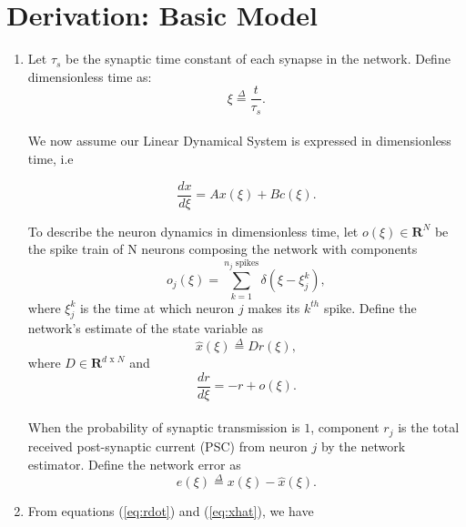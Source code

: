 \section{Derivation: Basic Model}
\label{section:derivation:basic_model}
\begin{enumerate}
    \item Let $\tau_s$ be the synaptic time constant of each synapse in the network. Define dimensionless time as:
    \begin{equation*}
        \xi \overset{\Delta}{=} \frac{t}{\tau_s}.
    \end{equation*}\\
    We now assume our Linear Dynamical System is expressed in dimensionless time, i.e
    
    \begin{equation}
        \label{eq:lds_dimensionless}
        \frac{dx}{d\xi} = Ax(\xi) + B c(\xi).
    \end{equation}
    
    To describe the neuron dynamics in dimensionless time, let $o(\xi) \in \mathbf{R}^{N}$ be the spike train of N neurons composing the network with components
    \begin{equation*}
        o_j(\xi) = \sum_{k=1}^{\text{$n_j$ spikes}} \delta(\xi - \xi_{j}^{k}),
    \end{equation*}
    where $\xi_j^k$ is the time at which neuron $j$ makes its $k^{th}$ spike. 
    Define the network's estimate of the state variable as
    \begin{equation}
        \label{eq:xhat}
        \hat{x}(\xi)
        \overset{\Delta}{=} D r(\xi), 
    \end{equation}
    where $D \in \mathbf{R}^{d \text{ x } N}$ and 
    \begin{equation}
    \label{eq:rdot}
        \frac{dr}{d \xi} = -r + o(\xi).
    \end{equation}\\
    When the probability of synaptic transmission is $1$, component $r_j$ is the total received post-synaptic current (PSC) from neuron $j$ by the network estimator. 
    Define the network error as
    \begin{equation}
    \label{eq:error_def}
        e(\xi) \overset{\Delta}{=} x(\xi) - \hat{x}(\xi).
    \end{equation}
    
    \item From equations (\ref{eq:rdot}) and (\ref{eq:xhat}), we have
    

\end{enumerate}
